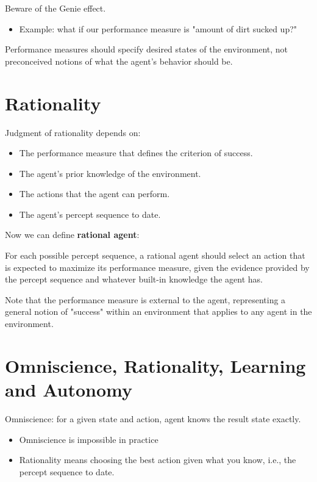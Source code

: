 \documentclass[11pt]{article}
\renewenvironment{quote}{\begin{shaded*}\begin{oldquote}}{\end{oldquote}\end{shaded*}}
\begin{document}
Beware of the Genie effect.

\begin{itemize}
\item Example: what if our performance measure is "amount of dirt sucked up?"
\end{itemize}

\begin{quote}
Performance measures should specify desired states of the environment, not preconceived notions of what the agent's behavior should be.
\end{quote}
\section{Rationality}
\label{sec:org157e8aa}

Judgment of rationality depends on:

\begin{itemize}
\item The performance measure that defines the criterion of success.
\item The agent’s prior knowledge of the environment.
\item The actions that the agent can perform.
\item The agent’s percept sequence to date.
\end{itemize}

Now we can define \textbf{rational agent}:

\begin{quote}
For each possible percept sequence, a rational agent should select an action that is expected to maximize its performance measure, given the evidence provided by the percept sequence and whatever built-in knowledge the agent has.
\end{quote}

Note that the performance measure is external to the agent, representing a general notion of "success" within an environment that applies to any agent in the environment.
\section{Omniscience, Rationality, Learning and Autonomy}
\label{sec:org60cea52}

Omniscience: for a given state and action, agent knows the result state exactly.

\begin{itemize}
\item Omniscience is impossible in practice
\item Rationality means choosing the best action given what you know, i.e., the percept sequence to date.
\end{itemize}
\end{document}

